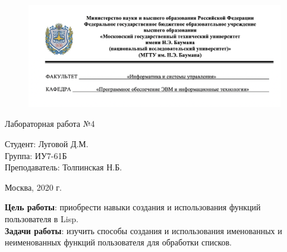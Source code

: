 


	
\begin{figure}[h!]
	\begin{center}
		{\includegraphics[width = \textwidth]{titul.png}}
	\end{center}
\end{figure}

\vspace*{20mm}

\huge
\begin{center}
	Лабораторная работа №4
\end{center}


\vspace*{50mm}

\large
\begin{flushleft}
	Студент: Луговой Д.М. \\
	Группа: ИУ7-61Б \\
	Преподаватель: Толпинская Н.Б.
\end{flushleft}

\vspace*{60mm}

\large
\begin{center}
	Москва, 2020 г.
\end{center}

\thispagestyle{empty}

\newpage
\vspace*{10mm}
\textbf{Цель работы}: приобрести навыки создания и использования функций пользователя в Lisp.\\

\textbf{Задачи работы}: изучить способы создания и использования именованных и неименованных функций пользователя для обработки списков.

